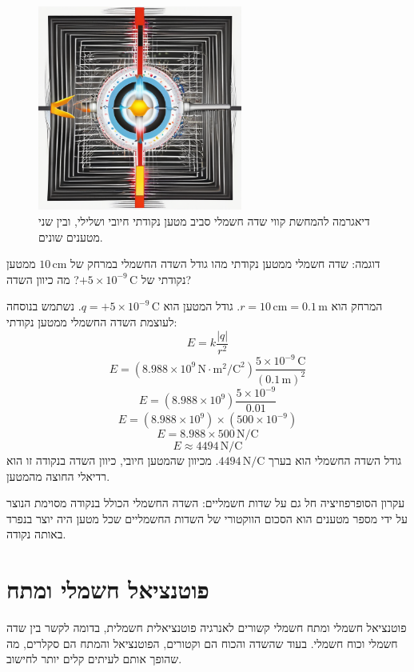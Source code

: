 \documentclass[12pt]{article}
\begin{document}
\begin{figure}[H]
  \centering
  \includegraphics[width=0.6\textwidth]{files/electric_field_diagram.png}
  \caption{דיאגרמה להמחשת קווי שדה חשמלי סביב מטען נקודתי חיובי ושלילי, ובין שני מטענים שונים.}
\end{figure}

\begin{exampleBox}{דוגמה: שדה חשמלי ממטען נקודתי}
מהו גודל השדה החשמלי במרחק של \(10 \, \text{cm}\) ממטען נקודתי של \(+5 \times 10^{-9} \, \text{C}\)? מה כיוון השדה?

המרחק הוא \(r = 10 \, \text{cm} = 0.1 \, \text{m}\). גודל המטען הוא \(q = +5 \times 10^{-9} \, \text{C}\).
נשתמש בנוסחה לעוצמת השדה החשמלי ממטען נקודתי:
\[E = k \frac{|q|}{r^2}\]
\[E = (8.988 \times 10^9 \, \text{N} \cdot \text{m}^2/\text{C}^2) \frac{5 \times 10^{-9} \, \text{C}}{(0.1 \, \text{m})^2}\]
\[E = (8.988 \times 10^9) \frac{5 \times 10^{-9}}{0.01}\]
\[E = (8.988 \times 10^9) \times (500 \times 10^{-9})\]
\[E = 8.988 \times 500 \, \text{N}/\text{C}\]
\[E \approx 4494 \, \text{N}/\text{C}\]
גודל השדה החשמלי הוא בערך \(4494 \, \text{N}/\text{C}\). מכיוון שהמטען חיובי, כיוון השדה בנקודה זו הוא רדיאלי החוצה מהמטען.
\end{exampleBox}

עקרון הסופרפוזיציה חל גם על שדות חשמליים: השדה החשמלי הכולל בנקודה מסוימת הנוצר על ידי מספר מטענים הוא הסכום הווקטורי של השדות החשמליים שכל מטען היה יוצר בנפרד באותה נקודה.

\section{פוטנציאל חשמלי ומתח}

פוטנציאל חשמלי ומתח חשמלי קשורים לאנרגיה פוטנציאלית חשמלית, בדומה לקשר בין שדה חשמלי וכוח חשמלי. בעוד שהשדה והכוח הם וקטורים, הפוטנציאל והמתח הם סקלרים, מה שהופך אותם לעיתים קלים יותר לחישוב.
\end{document}
